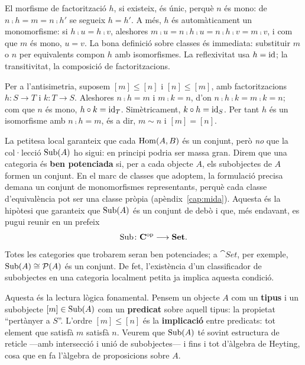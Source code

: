 \begin{prova}
El morfisme de factorització $h$, si existeix, és únic, perquè $n$ és mono: de $n\comp h=m=n\comp h'$ se segueix $h=h'$. A més, $h$ és automàticament un monomorfisme: si $h\comp u=h\comp v$, aleshores $m\comp u=n\comp h\comp u=n\comp h\comp v=m\comp v$, i com que $m$ és mono, $u=v$. La bona definició sobre classes és immediata: substituir $m$ o $n$ per equivalents compon $h$ amb isomorfismes. La reflexivitat usa $h=\operatorname{id}$; la transitivitat, la composició de factoritzacions.

Per a l'antisimetria, suposem $[m]\leq[n]$ i $[n]\leq[m]$, amb factoritzacions $h\colon S\to T$ i $k\colon T\to S$. Aleshores $n\comp h=m$ i $m\comp k=n$, d'on $n\comp h\comp k=m\comp k=n$; com que $n$ és mono, $h\circ k=\operatorname{id}_T$. Simètricament, $k\circ h=\operatorname{id}_S$. Per tant $h$ és un isomorfisme amb $n\comp h=m$, és a dir, $m\sim n$ i $[m]=[n]$.
\end{prova}

\begin{observacio}
La petitesa local garanteix que cada $\operatorname{Hom}(A,B)$ és un conjunt, però \emph{no} que la col·lecció $\operatorname{Sub}(A)$ ho sigui: en principi podria ser massa gran. Direm que una categoria és \textbf{ben potenciada} si, per a cada objecte $A$, els subobjectes de $A$ formen un conjunt. En el marc de classes que adoptem, la formulació precisa demana un conjunt de monomorfismes representants, perquè cada classe d'equivalència pot ser una classe pròpia (apèndix~\ref{cap:mida}). Aquesta és la hipòtesi que garanteix que $\operatorname{Sub}(A)$ és un conjunt de debò i que, més endavant, es pugui reunir en un prefeix
\[
\operatorname{Sub}\colon\mathbf{C}^{\mathrm{op}}\longrightarrow\mathbf{Set}.
\]
Totes les categories que trobarem seran ben potenciades; a $\cat{Set}$, per exemple, $\operatorname{Sub}(A)\cong\mathcal{P}(A)$ és un conjunt. De fet, l'existència d'un classificador de subobjectes en una categoria localment petita ja implica aquesta condició.
\end{observacio}

\begin{observacio}
Aquesta és la lectura lògica fonamental. Pensem un objecte $A$ com un \textbf{tipus} i un subobjecte $[m]\in\operatorname{Sub}(A)$ com un \textbf{predicat} sobre aquell tipus: la propietat \enquote{pertànyer a $S$}. L'ordre $[m]\leq[n]$ és la \textbf{implicació} entre predicats: tot element que satisfà $m$ satisfà $n$. Veurem que $\operatorname{Sub}(A)$ té sovint estructura de reticle ---amb intersecció i unió de subobjectes--- i fins i tot d'àlgebra de Heyting, cosa que en fa l'àlgebra de proposicions sobre $A$.
\end{observacio}

